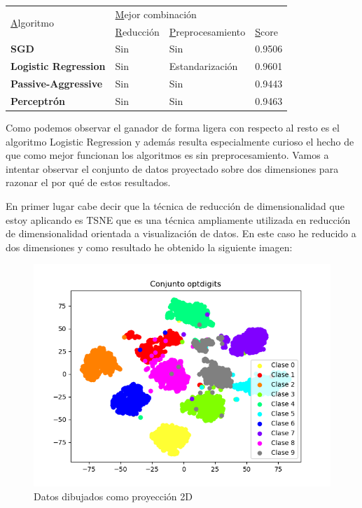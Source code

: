 \documentclass[12pt,a4paper]{article}
\begin{document}
\begin{table}[H]
	\begin{tabular}{|l|l|l|l|}
		\hline
		\multirow{2}{*}{{\ul Algoritmo}} & \multicolumn{3}{l|}{{\ul Mejor combinación}}           \\ \cline{2-4} 
		& {\ul Reducción} & {\ul Preprocesamiento} & {\ul Score} \\ \hline
		\textbf{SGD}                     & Sin             & Sin                    & 0.9506      \\ \hline
		\textbf{Logistic Regression}     & Sin             & Estandarización        & 0.9601      \\ \hline
		\textbf{Passive-Aggressive}      & Sin             & Sin                    & 0.9443      \\ \hline
		\textbf{Perceptrón}              & Sin             & Sin                    & 0.9463      \\ \hline
	\end{tabular}
\end{table}

Como podemos observar el ganador de forma ligera con respecto al resto es el algoritmo Logistic Regression y además resulta especialmente curioso el hecho de que como mejor funcionan los algoritmos es sin preprocesamiento. Vamos a intentar observar el conjunto de datos proyectado sobre dos dimensiones para razonar el por qué de estos resultados.

En primer lugar cabe decir que la técnica de reducción de dimensionalidad que estoy aplicando es TSNE que es una técnica ampliamente utilizada en reducción de dimensionalidad orientada a visualización de datos. En este caso he reducido a dos dimensiones y como resultado he obtenido la siguiente imagen:

\begin{figure}[H]
	\centering
	\includegraphics[scale=0.8]{./Imagenes/datos_tsne.png}
	\caption{Datos dibujados como proyección 2D}
\end{figure}
\end{document}
